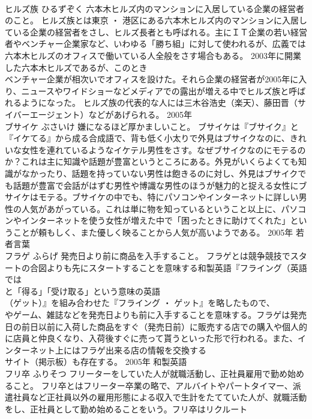 \documentclass[8pt]{extreport}
\begin{document}
\begin{CJK}{UTF8}{min}
\\	ヒルズ族	ひるずぞく	六本木ヒルズ内のマンションに入居している企業の経営者のこと。	ヒルズ族とは東京 ・ 港区にある六本木ヒルズ内のマンションに入居している企業の経営者をさし、ヒルズ長者とも呼ばれる。主にＩＴ企業の若い経営者やベンチャー企業家など、いわゆる「勝ち組」に対して使われるが、広義では六本木ヒルズのオフィスで働いている人全般をさす場合もある。 2003年に開業した六本木ヒルズであるが、このとき
\\	ベンチャー企業が相次いでオフィスを設けた。それら企業の経営者が2005年に入り、ニュースやワイドショーなどメディアでの露出が増える中でヒルズ族と呼ばれるようになった。 ヒルズ族の代表的な人には三木谷浩史（楽天）、藤田晋（サイバーエージェント）などがあげられる。	2005年	
\\	ブサイケ	ぶさいけ	嫌になるほど厚かましいこと。	ブサイケは『ブサイク』と『イケてる』から成る合成語で、背も低く小太りで外見はブサイクなのに、きれいな女性を連れているようなイケテル男性をさす。なぜブサイクなのにモテるのか？これは主に知識や話題が豊富というところにある。外見がいくらよくても知識がなかったり、話題を持っていない男性は飽きるのに対し、外見はブサイクでも話題が豊富で会話がはずむ男性や博識な男性のほうが魅力的と捉える女性にブサイケはモテる。ブサイケの中でも、特にパソコンやインターネットに詳しい男性の人気があがっている。これは単に物を知っているということ以上に、パソコンやインターネットを使う女性が増えた中で「困ったときに助けてくれた」ということが頼もしく、また優しく映ることから人気が高いようである。	2005年	若者言葉	
\\	フラゲ	ふらげ	発売日より前に商品を入手すること。	フラゲとは競争競技でスタートの合図よりも先にスタートすることを意味する和製英語『フライング（英語では
\\	と「得る」「受け取る」という意味の英語
\\	（ゲット）』を組み合わせた『フライング ・ ゲット』を略したもので、
\\	やゲーム、雑誌などを発売日よりも前に入手することを意味する。フラゲは発売日の前日以前に入荷した商品をすぐ（発売日前）に販売する店での購入や個人的に店員と仲良くなり、入荷後すぐに売って貰うといった形で行われる。また、インターネット上にはフラゲ出来る店の情報を交換する
\\	サイト（掲示板）も存在する。	2005年	和製英語	
\\	フリ卒	ふりそつ	フリーターをしていた人が就職活動し、正社員雇用で勤め始めること。	フリ卒とはフリーター卒業の略で、アルバイトやパートタイマー、派遣社員など正社員以外の雇用形態による収入で生計をたてていた人が、就職活動をし、正社員として勤め始めることをいう。フリ卒はリクルート

\end{CJK}
\end{document}
